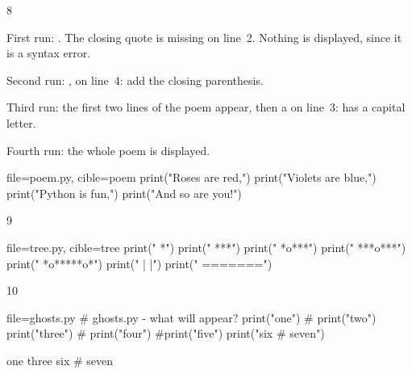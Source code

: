 \begin{corrige}{8}
\begin{etapes}
\item First run: . The closing
  quote is missing on line~2. Nothing is displayed, since it is a syntax error.
\item Second run: , on line~4: add the closing parenthesis.
\item Third run: the first two lines of the poem appear, then a  on line~3:
   has a capital letter.
\item Fourth run: the whole poem is displayed.
\end{etapes}
\begin{code}{file=poem.py, cible=poem}
print("Roses are red,")
print("Violets are blue,")
print("Python is fun,")
print("And so are you!")
\end{code}
\end{corrige}

\begin{corrige}{9}
\begin{code}{file=tree.py, cible=tree}
print("     *")
print("    ***")
print("   *o***")
print("  ***o***")
print(" *o*****o*")
print("    | |")
print("  =======")
\end{code}
\end{corrige}

\begin{corrige}{10}
\begin{code}{file=ghosts.py}
# ghosts.py - what will appear?
print("one")
# print("two")
print("three")  # print("four")
#print("five")
print("six # seven")
\end{code}
\begin{sortie}
one
three
six # seven
\end{sortie}
\end{corrige}

